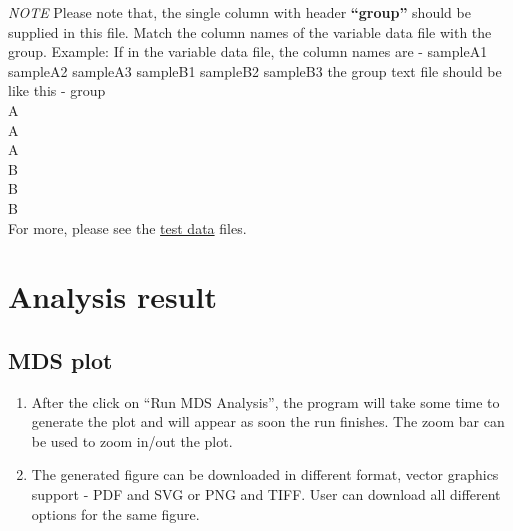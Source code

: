 \documentclass[
  a4paper,
  oneside,
  open=any]{scrreport}
\providecommand{\tightlist}{%
  \setlength{\itemsep}{0pt}\setlength{\parskip}{0pt}}\usepackage{longtable,booktabs,array}
\begin{document}
\begin{tcolorbox}[enhanced jigsaw, left=2mm, colback=white, breakable, leftrule=.75mm, coltitle=black, toprule=.15mm, rightrule=.15mm, colbacktitle=quarto-callout-note-color!10!white, title=\textcolor{quarto-callout-note-color}{\faInfo}\hspace{0.5em}{Note}, opacitybacktitle=0.6, colframe=quarto-callout-note-color-frame, bottomrule=.15mm, bottomtitle=1mm, toptitle=1mm, titlerule=0mm, opacityback=0, arc=.35mm]
\emph{NOTE} Please note that, the single column with header
\textbf{``group''} should be supplied in this file. Match the column
names of the variable data file with the group. Example: If in the
variable data file, the column names are - sampleA1 sampleA2 sampleA3
sampleB1 sampleB2 sampleB3 the group text file should be like this -
group\\
A\\
A\\
A\\
B\\
B\\
B\\
For more, please see the
\href{https://sourceforge.net/projects/methylr/}{test data} files.
\end{tcolorbox}

\hypertarget{analysis-result}{%
\section{Analysis result}\label{analysis-result}}

\hypertarget{mds-plot}{%
\subsection{MDS plot}\label{mds-plot}}

\begin{enumerate}
\def\labelenumi{\arabic{enumi}.}
\tightlist
\item
  After the click on ``Run MDS Analysis'', the program will take some
  time to generate the plot and will appear as soon the run finishes.
  The zoom bar can be used to zoom in/out the plot.
\item
  The generated figure can be downloaded in different format, vector
  graphics support - PDF and SVG or PNG and TIFF. User can download all
  different options for the same figure.\\
\end{enumerate}
\end{document}
